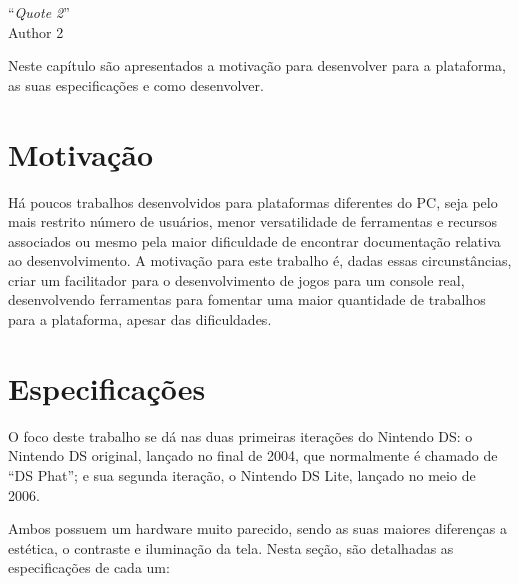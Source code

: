\documentclass[brazil]{abnt}
\begin{document}
\vfill{}
\begin{flushright}{}``\emph{Quote 2}''\\
{\small Author 2}\end{flushright}{\small \par}
\vfill{}

Neste capítulo são apresentados a motivação para desenvolver para a plataforma, as suas especificações e como desenvolver.
\newpage

\section{Motivação}

Há poucos trabalhos desenvolvidos para plataformas diferentes do PC, seja pelo mais restrito número de usuários, menor versatilidade de ferramentas e recursos associados ou mesmo pela maior dificuldade de encontrar documentação relativa ao desenvolvimento. A motivação para este trabalho é, dadas essas circunstâncias, criar um facilitador para o desenvolvimento de jogos para um console real, desenvolvendo ferramentas para fomentar uma maior quantidade de trabalhos para a plataforma, apesar das dificuldades.

\section{Especificações}

O foco deste trabalho se dá nas duas primeiras iterações do Nintendo DS: o Nintendo DS original, lançado no final de 2004, que normalmente é chamado de ``DS Phat''; e sua segunda iteração, o Nintendo DS Lite, lançado no meio de 2006.

Ambos possuem um hardware muito parecido, sendo as suas maiores diferenças a estética, o contraste e iluminação da tela. Nesta seção, são detalhadas as especificações de cada um:
\end{document}
